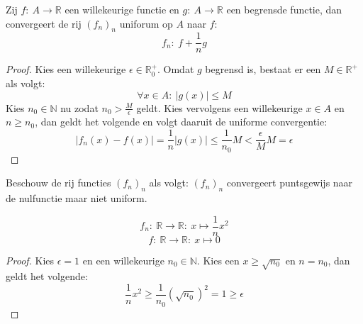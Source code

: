 \documentclass[main.tex]{subfiles}
\begin{document}
\begin{vb}
  Zij $f:\ A \rightarrow \mathbb{R}$ een willekeurige functie en $g:\ A \rightarrow \mathbb{R}$ een begrensde functie, dan convergeert de rij $(f_{n})_{n}$ uniforum op $A$ naar $f$:
  \[ f_{n}:\ f + \frac{1}{n}g \]

  \begin{proof}
    Kies een willekeurige $\epsilon \in \mathbb{R}_{0}^{+}$.
    Omdat $g$ begrensd is, bestaat er een $M \in \mathbb{R}^{+}$ als volgt:
    \[ \forall x \in A:\ |g(x)| \le M \]
    Kies $n_{0}\in \mathbb{N}$ nu zodat $n_{0} > \frac{M}{\epsilon}$ geldt.
    Kies vervolgens een willekeurige $x\in A$ en $n \ge n_{0}$, dan geldt het volgende en volgt daaruit de uniforme convergentie:
    \[ |f_{n}(x) - f(x)| = \frac{1}{n}|g(x)| \le \frac{1}{n_{0}}M < \frac{\epsilon}{M}M = \epsilon \]
  \end{proof}
\end{vb}

\begin{vb}
  Beschouw de rij functies $(f_{n})_{n}$ als volgt:
  $(f_{n})_{n}$ convergeert puntsgewijs naar de nulfunctie maar niet uniform.

  \noindent
  \begin{minipage}{.45\textwidth}
    \begin{figure}[H]
      \centering
    \end{figure}
  \end{minipage}
  \begin{minipage}{.45\textwidth}
    \[ f_{n}:\ \mathbb{R} \rightarrow \mathbb{R}:\ x \mapsto \frac{1}{n}x^{2} \]
    \[ f:\ \mathbb{R} \rightarrow \mathbb{R}:\ x \mapsto 0 \]
  \end{minipage}

  \begin{proof}
    Kies $\epsilon = 1$ en een willekeurige $n_{0} \in \mathbb{N}$.
    Kies een $x \ge \sqrt{n_{0}}$ en $n = n_{0}$, dan geldt het volgende:
    \[ \frac{1}{n}x^{2} \ge \frac{1}{n_{0}}\left(\sqrt{n_{0}}\right)^{2} = 1 \ge \epsilon \]
  \end{proof}
\end{vb}
\end{document}
